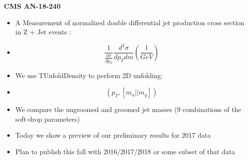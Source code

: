 \documentclass{beamer}
\begin{document}
\begin{frame}{\textbf{CMS AN-18-240}}
\vspace{3.5mm}
\begin{itemize}
\item A Measurement of normalized double differential jet production cross section in Z + Jet events :
\item[] $$ \frac{1}{ \frac{d\sigma}{dp_{T}} }   \frac{d^2\sigma}{dp_{T} dm}  (\frac{1}{GeV})  $$
\item We use TUnfoldDensity to perform 2D unfolding:
\item[] $$ ( p_{T} , [ m_u || m_g ] ) $$
\item We compare the ungroomed and groomed jet masses (9 combinations of the soft-drop parameters)
\item Today we show a preview of our preliminary results for 2017 data
\item Plan to publish this fall with 2016/2017/2018 or some subset of that data
\end{itemize}
\end{frame}
\end{document}
